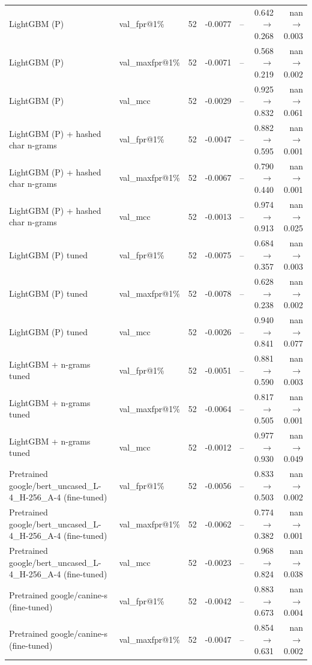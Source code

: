 \begin{table}[t]
\begin{tabular}{llrrrrr}
LightGBM (P) & val\_fpr@1\% & 52 & -0.0077 & -- & 0.642$\rightarrow$0.268 & nan$\rightarrow$0.003 \\
LightGBM (P) & val\_maxfpr@1\% & 52 & -0.0071 & -- & 0.568$\rightarrow$0.219 & nan$\rightarrow$0.002 \\
LightGBM (P) & val\_mcc & 52 & -0.0029 & -- & 0.925$\rightarrow$0.832 & nan$\rightarrow$0.061 \\
LightGBM (P) + hashed char n-grams & val\_fpr@1\% & 52 & -0.0047 & -- & 0.882$\rightarrow$0.595 & nan$\rightarrow$0.001 \\
LightGBM (P) + hashed char n-grams & val\_maxfpr@1\% & 52 & -0.0067 & -- & 0.790$\rightarrow$0.440 & nan$\rightarrow$0.001 \\
LightGBM (P) + hashed char n-grams & val\_mcc & 52 & -0.0013 & -- & 0.974$\rightarrow$0.913 & nan$\rightarrow$0.025 \\
LightGBM (P) tuned & val\_fpr@1\% & 52 & -0.0075 & -- & 0.684$\rightarrow$0.357 & nan$\rightarrow$0.003 \\
LightGBM (P) tuned & val\_maxfpr@1\% & 52 & -0.0078 & -- & 0.628$\rightarrow$0.238 & nan$\rightarrow$0.002 \\
LightGBM (P) tuned & val\_mcc & 52 & -0.0026 & -- & 0.940$\rightarrow$0.841 & nan$\rightarrow$0.077 \\
LightGBM + n-grams tuned & val\_fpr@1\% & 52 & -0.0051 & -- & 0.881$\rightarrow$0.590 & nan$\rightarrow$0.003 \\
LightGBM + n-grams tuned & val\_maxfpr@1\% & 52 & -0.0064 & -- & 0.817$\rightarrow$0.505 & nan$\rightarrow$0.001 \\
LightGBM + n-grams tuned & val\_mcc & 52 & -0.0012 & -- & 0.977$\rightarrow$0.930 & nan$\rightarrow$0.049 \\
Pretrained google/bert\_uncased\_L-4\_H-256\_A-4 (fine-tuned) & val\_fpr@1\% & 52 & -0.0056 & -- & 0.833$\rightarrow$0.503 & nan$\rightarrow$0.002 \\
Pretrained google/bert\_uncased\_L-4\_H-256\_A-4 (fine-tuned) & val\_maxfpr@1\% & 52 & -0.0062 & -- & 0.774$\rightarrow$0.382 & nan$\rightarrow$0.001 \\
Pretrained google/bert\_uncased\_L-4\_H-256\_A-4 (fine-tuned) & val\_mcc & 52 & -0.0023 & -- & 0.968$\rightarrow$0.824 & nan$\rightarrow$0.038 \\
Pretrained google/canine-s (fine-tuned) & val\_fpr@1\% & 52 & -0.0042 & -- & 0.883$\rightarrow$0.673 & nan$\rightarrow$0.004 \\
Pretrained google/canine-s (fine-tuned) & val\_maxfpr@1\% & 52 & -0.0047 & -- & 0.854$\rightarrow$0.631 & nan$\rightarrow$0.002 \\

\end{tabular}
\end{table}
